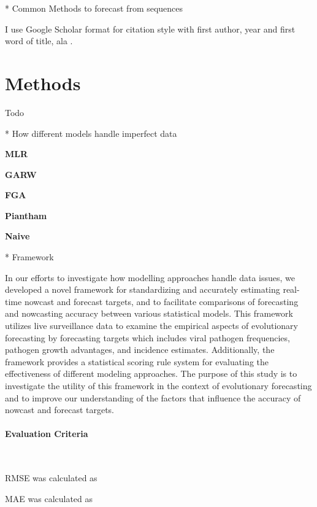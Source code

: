 \documentclass[11pt,oneside,letterpaper]{article}
\begin{document}
* Common Methods to forecast from sequences












I use Google Scholar format for citation style with first author, year and first word of title, ala \cite{hadfield2018nextstrain}.

\section*{Methods}

Todo



* How different models handle imperfect data

\textbf{MLR}

\textbf{GARW}

\textbf{FGA}

\textbf{Piantham}

\textbf{Naive}


* Framework

In our efforts to investigate how modelling approaches handle data issues, we developed a novel framework for standardizing and accurately estimating real-time nowcast and forecast targets, and to facilitate comparisons of forecasting and nowcasting accuracy between various statistical models.
This framework utilizes live surveillance data to examine the empirical aspects of evolutionary forecasting by forecasting targets which includes viral pathogen frequencies, pathogen growth advantages, and incidence estimates. 
Additionally, the framework provides a statistical scoring rule system for evaluating the effectiveness of different modeling approaches.
The purpose of this study is to investigate the utility of this framework in the context of evolutionary forecasting and to improve our understanding of the factors that influence the accuracy of nowcast and forecast targets.


\paragraph{Evaluation Criteria}\

RMSE was calculated as


MAE was calculated as

\end{document}

